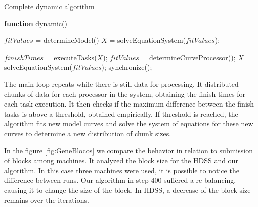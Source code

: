 \documentclass[journal]{IEEEtran}
\begin{document}
\begin{algorithm}

\caption{Complete dynamic algorithm}
\label{alg1}

\begin{algorithmic}		

\STATE \textbf{function} dynamic()

\STATE $fitValues$ = determineModel()
\STATE $X$ = solveEquationSystem($fitValues$);


	\STATE $finishTimes$ = executeTasks($X$);
		\STATE $fitValues$ = determineCurveProcessor();
                \STATE $X$ = solveEquationSystem($fitValues$);
                \STATE synchronize();
    	\ENDIF
\ENDWHILE

\end{algorithmic}
\end{algorithm}

The main loop repeats while there is still data for processing. It distributed
chunks of data for each processor in the system, obtaining the finish times for
each task execution. It then checks if the maximum difference between the finish
tasks is above a threshold, obtained empirically. If threshold is reached, the
algorithm fits new model curves and solve the system of equations for these new
curves to determine a new distribution of chunk sizes.

In the figure \ref{fig:GeneBlocos} we compare the behavior in relation to submission of blocks among machines. It analyzed the block size for the HDSS and our algorithm. In this case three machines were used, it is possible to notice the difference between runs. Our algorithm in step 400 suffered a re-balancing, causing it to change the size of the block. In HDSS, a decrease of the block size remains over the iterations.
\end{document}
